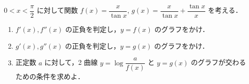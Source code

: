 \documentclass[../../main.tex]{subfiles}
\begin{document}
$\displaystyle 0 < x < \dfrac{\pi}{2}$ に対して関数 $\displaystyle f(x) = \dfrac{x}{\tan x}$, $\displaystyle g(x) = \dfrac{x}{\tan x} + \dfrac{\tan x}{x}$ を考える．
\begin{enumerate}
  \item $f'(x), f''(x)$ の正負を判定し，$y=f(x)$ のグラフをかけ．
  \item $g'(x), g''(x)$ の正負を判定し，$y=g(x)$ のグラフをかけ．
  \item 正定数 $a$ に対して，2 曲線 $y = \log \dfrac{a}{f(x)}$ と $y=g(x)$ のグラフが交わるための条件を求めよ．
\end{enumerate}
\end{document}
